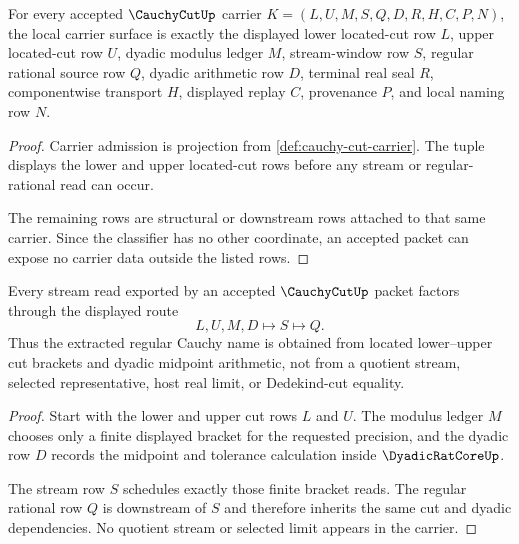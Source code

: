 \begin{theorem}
\label{thm:cauchy-cut-carrier-admission}
For every accepted $\CauchyCutUp$ carrier $K=(L,U,M,S,Q,D,R,H,C,P,N)$, the local carrier surface is exactly the displayed lower located-cut row $L$, upper located-cut row $U$, dyadic modulus ledger $M$, stream-window row $S$, regular rational source row $Q$, dyadic arithmetic row $D$, terminal real seal $R$, componentwise transport $H$, displayed replay $C$, provenance $P$, and local naming row $N$.
\end{theorem}
\begin{proof}
Carrier admission is projection from \autoref{def:cauchy-cut-carrier}. The tuple displays the lower and upper located-cut rows before any stream or regular-rational read can occur.

The remaining rows are structural or downstream rows attached to that same carrier. Since the classifier has no other coordinate, an accepted packet can expose no carrier data outside the listed rows.
\end{proof}

\begin{theorem}
\label{thm:cauchy-cut-stream-extraction}
Every stream read exported by an accepted $\CauchyCutUp$ packet factors through the displayed route
$$
L,U,M,D \longmapsto S \longmapsto Q .
$$
Thus the extracted regular Cauchy name is obtained from located lower--upper cut brackets and dyadic midpoint arithmetic, not from a quotient stream, selected representative, host real limit, or Dedekind-cut equality.
\end{theorem}
\begin{proof}
Start with the lower and upper cut rows $L$ and $U$. The modulus ledger $M$ chooses only a finite displayed bracket for the requested precision, and the dyadic row $D$ records the midpoint and tolerance calculation inside $\DyadicRatCoreUp$.

The stream row $S$ schedules exactly those finite bracket reads. The regular rational row $Q$ is downstream of $S$ and therefore inherits the same cut and dyadic dependencies. No quotient stream or selected limit appears in the carrier.
\end{proof}

